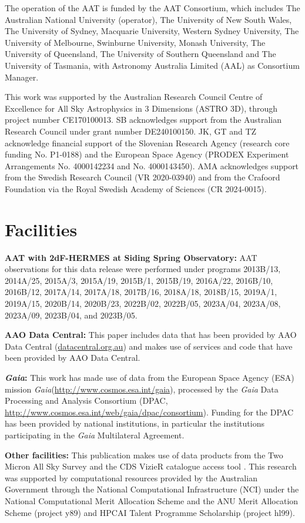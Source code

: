 \documentclass[
  journal=pasa,
  manuscript=research-paper, %
  year=2024,
  volume=37
]{cup-journal}
\newcommand{\Gaia}{\textit{Gaia}\xspace}
\begin{document}
The operation of the AAT is funded by the AAT Consortium, which includes The Australian National University (operator), The University of New South Wales, The University of Sydney, Macquarie University, Western Sydney University, The University of Melbourne, Swinburne University, Monash University, The University of Queensland, The University of Southern Queensland and The University of Tasmania, with Astronomy Australia Limited (AAL) as Consortium Manager.

This work was supported by the Australian Research Council Centre of Excellence for All Sky Astrophysics in 3 Dimensions (ASTRO 3D), through project number CE170100013. SB acknowledges support from the Australian Research Council under grant number DE240100150. JK, GT and TZ acknowledge financial support of the Slovenian Research Agency (research core funding No. P1-0188) and the European Space Agency (PRODEX Experiment Arrangements No. 4000142234 and No. 4000143450). AMA acknowledges support from the Swedish Research Council (VR 2020-03940) and from the Crafoord Foundation via the Royal Swedish Academy of Sciences (CR 2024-0015).

\section*{Facilities}

\textbf{AAT with 2dF-HERMES at Siding Spring Observatory:}
AAT observations for this data release were performed under programs {2013B/13}, {2014A/25}, {2015A/3}, {2015A/19}, {2015B/1}, {2015B/19}, {2016A/22}, {2016B/10}, {2016B/12}, {2017A/14}, {2017A/18}, {2017B/16}, {2018A/18}, {2018B/15}, {2019A/1}, {2019A/15}, {2020B/14}, {2020B/23}, {2022B/02}, {2022B/05}, {2023A/04}, {2023A/08}, {2023A/09}, {2023B/04}, and {2023B/05}.

\textbf{AAO Data Central:} This paper includes data that has been provided by AAO Data Central  (\url{datacentral.org.au}) and makes use of services and code that have been provided by AAO Data Central.

\textbf{\Gaia: } This work has made use of data from the European Space Agency (ESA) mission \Gaia (\url{http://www.cosmos.esa.int/gaia}), processed by the \Gaia Data Processing and Analysis Consortium (DPAC, \url{http://www.cosmos.esa.int/web/gaia/dpac/consortium}). Funding for the DPAC has been provided by national institutions, in particular the institutions participating in the \Gaia Multilateral Agreement. 

\textbf{Other facilities:} This publication makes use of data products from the Two Micron All Sky Survey \citep{Skrutskie2006} and the CDS VizieR catalogue access tool \citep{Vizier2000}. This research was supported by computational resources provided by the Australian Government through the National Computational Infrastructure (NCI) under the National Computational Merit Allocation Scheme and the ANU Merit Allocation Scheme (project y89) and HPCAI Talent Programme Scholarship (project hl99).
\end{document}
